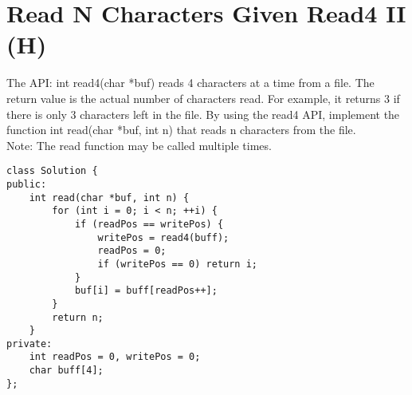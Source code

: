 \section{Read N Characters Given Read4 II (H)}
The API: int read4(char *buf) reads 4 characters at a time from a file. The return value is the actual number of characters read. For example, it returns 3 if there is only 3 characters left in the file. By using the read4 API, implement the function int read(char *buf, int n) that reads n characters from the file.\\

Note: The read function may be called multiple times. \\

\begin{lstlisting}
class Solution {
public:
    int read(char *buf, int n) {
        for (int i = 0; i < n; ++i) {
            if (readPos == writePos) {
                writePos = read4(buff);
                readPos = 0;
                if (writePos == 0) return i;
            }
            buf[i] = buff[readPos++];
        }
        return n;
    }
private:
    int readPos = 0, writePos = 0;
    char buff[4];
};
\end{lstlisting}
